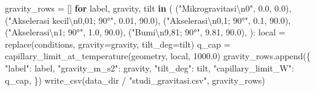 \documentclass[
  12pt,
  12pt,a4paper,oneside]{report}
\newenvironment{Shaded}{}{}
\newcommand{\CharTok}[1]{\textcolor[rgb]{0.25,0.44,0.63}{#1}}
\newcommand{\ControlFlowTok}[1]{\textcolor[rgb]{0.00,0.44,0.13}{\textbf{#1}}}
\newcommand{\FloatTok}[1]{\textcolor[rgb]{0.25,0.63,0.44}{#1}}
\newcommand{\KeywordTok}[1]{\textcolor[rgb]{0.00,0.44,0.13}{\textbf{#1}}}
\newcommand{\NormalTok}[1]{#1}
\newcommand{\OperatorTok}[1]{\textcolor[rgb]{0.40,0.40,0.40}{#1}}
\newcommand{\StringTok}[1]{\textcolor[rgb]{0.25,0.44,0.63}{#1}}
\begin{document}
\begin{Shaded}
\begin{Highlighting}[]
\NormalTok{    gravity\_rows }\OperatorTok{=}\NormalTok{ []}
    \ControlFlowTok{for}\NormalTok{ label, gravity, tilt }\KeywordTok{in}\NormalTok{ (}
\NormalTok{        (}\StringTok{"Mikrogravitasi}\CharTok{\textbackslash{}n}\StringTok{0"}\NormalTok{, }\FloatTok{0.0}\NormalTok{, }\FloatTok{0.0}\NormalTok{),}
\NormalTok{        (}\StringTok{"Akselerasi kecil}\CharTok{\textbackslash{}n}\StringTok{0,01; 90°"}\NormalTok{, }\FloatTok{0.01}\NormalTok{, }\FloatTok{90.0}\NormalTok{),}
\NormalTok{        (}\StringTok{"Akselerasi}\CharTok{\textbackslash{}n}\StringTok{0,1; 90°"}\NormalTok{, }\FloatTok{0.1}\NormalTok{, }\FloatTok{90.0}\NormalTok{),}
\NormalTok{        (}\StringTok{"Akselerasi}\CharTok{\textbackslash{}n}\StringTok{1; 90°"}\NormalTok{, }\FloatTok{1.0}\NormalTok{, }\FloatTok{90.0}\NormalTok{),}
\NormalTok{        (}\StringTok{"Bumi}\CharTok{\textbackslash{}n}\StringTok{9,81; 90°"}\NormalTok{, }\FloatTok{9.81}\NormalTok{, }\FloatTok{90.0}\NormalTok{),}
\NormalTok{    ):}
\NormalTok{        local }\OperatorTok{=}\NormalTok{ replace(conditions, gravity}\OperatorTok{=}\NormalTok{gravity, tilt\_deg}\OperatorTok{=}\NormalTok{tilt)}
\NormalTok{        q\_cap }\OperatorTok{=}\NormalTok{ capillary\_limit\_at\_temperature(geometry, local, }\FloatTok{1000.0}\NormalTok{)}
\NormalTok{        gravity\_rows.append(\{}
            \StringTok{"label"}\NormalTok{: label, }\StringTok{"gravity\_m\_s2"}\NormalTok{: gravity, }\StringTok{"tilt\_deg"}\NormalTok{: tilt,}
            \StringTok{"capillary\_limit\_W"}\NormalTok{: q\_cap,}
\NormalTok{        \})}
\NormalTok{    write\_csv(data\_dir }\OperatorTok{/} \StringTok{"studi\_gravitasi.csv"}\NormalTok{, gravity\_rows)}


\end{Highlighting}
\end{Shaded}
\end{document}

